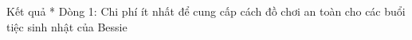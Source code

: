 Kết quả
* Dòng 1: Chi phí ít nhất để cung cấp cách đồ chơi an toàn cho các buổi tiệc sinh nhật của Bessie